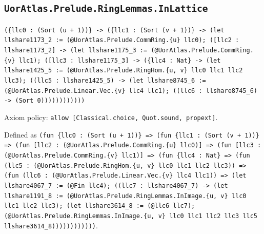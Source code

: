 \documentclass[11pt]{article}
\begin{document}
\subsection*{\texttt{UorAtlas.Prelude.RingLemmas.InLattice}}
\noindent\texttt{(\{llc0 : (Sort (u + 1))\} -> (\{llc1 : (Sort (v + 1))\} -> (let llshare1173\_2 := (@UorAtlas.Prelude.CommRing.\{u\} llc0); ([llc2 : llshare1173\_2] -> (let llshare1175\_3 := (@UorAtlas.Prelude.CommRing.\{v\} llc1); ([llc3 : llshare1175\_3] -> (\{llc4 : Nat\} -> (let llshare1425\_5 := (@UorAtlas.Prelude.RingHom.\{u, v\} llc0 llc1 llc2 llc3); ((llc5 : llshare1425\_5) -> (let llshare8745\_6 := (@UorAtlas.Prelude.Linear.Vec.\{v\} llc4 llc1); ((llc6 : llshare8745\_6) -> (Sort 0))))))))))))}\par
\noindent Axiom policy: \texttt{allow [Classical.choice, Quot.sound, propext]}.\par
\noindent Defined as \texttt{(fun \{llc0 : (Sort (u + 1))\} => (fun \{llc1 : (Sort (v + 1))\} => (fun [llc2 : (@UorAtlas.Prelude.CommRing.\{u\} llc0)] => (fun [llc3 : (@UorAtlas.Prelude.CommRing.\{v\} llc1)] => (fun \{llc4 : Nat\} => (fun (llc5 : (@UorAtlas.Prelude.RingHom.\{u, v\} llc0 llc1 llc2 llc3)) => (fun (llc6 : (@UorAtlas.Prelude.Linear.Vec.\{v\} llc4 llc1)) => (let llshare4067\_7 := (@Fin llc4); ((llc7 : llshare4067\_7) -> (let llshare1191\_8 := (@UorAtlas.Prelude.RingLemmas.InImage.\{u, v\} llc0 llc1 llc2 llc3); (let llshare3614\_8 := (@llc6 llc7); (@UorAtlas.Prelude.RingLemmas.InImage.\{u, v\} llc0 llc1 llc2 llc3 llc5 llshare3614\_8))))))))))))}.\par
\end{document}
